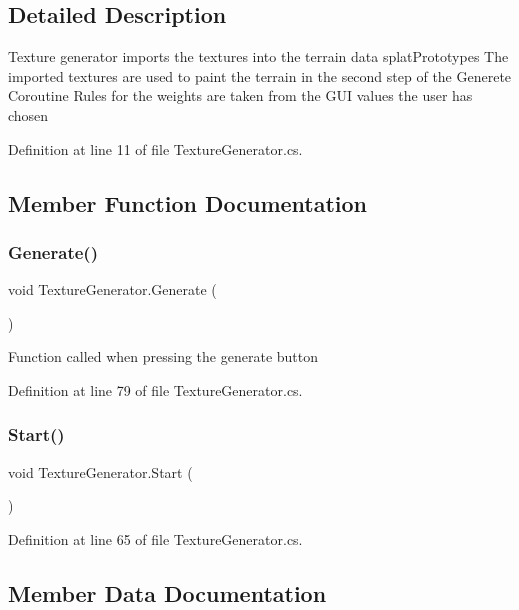 \subsection{Detailed Description}
Texture generator imports the textures into the terrain data splat\+Prototypes The imported textures are used to paint the terrain in the second step of the Generete Coroutine Rules for the weights are taken from the G\+UI values the user has chosen 



Definition at line 11 of file Texture\+Generator.\+cs.



\subsection{Member Function Documentation}
\mbox{\label{class_texture_generator_aab187583231f03ec5f53750854ec6689}} 
\subsubsection{Generate()}
{\footnotesize\ttfamily void Texture\+Generator.\+Generate (\begin{DoxyParamCaption}{ }\end{DoxyParamCaption})}



Function called when pressing the generate button 



Definition at line 79 of file Texture\+Generator.\+cs.

\mbox{\label{class_texture_generator_a303e799d80d41cd0b420d184e2343d44}} 
\subsubsection{Start()}
{\footnotesize\ttfamily void Texture\+Generator.\+Start (\begin{DoxyParamCaption}{ }\end{DoxyParamCaption})}



Definition at line 65 of file Texture\+Generator.\+cs.



\subsection{Member Data Documentation}
\mbox{\label{class_texture_generator_a57878944225e2820299ba28a917fa420}} 
